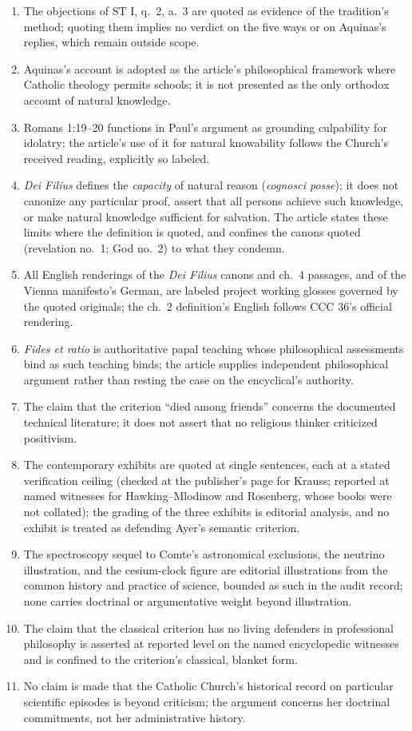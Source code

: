 \begin{enumerate}[leftmargin=1.45em,itemsep=0.25em]
\item The objections of ST I, q.~2, a.~3 are quoted as evidence of the tradition's method; quoting them implies no verdict on the five ways or on Aquinas's replies, which remain outside scope.
\item Aquinas's account is adopted as the article's philosophical framework where Catholic theology permits schools; it is not presented as the only orthodox account of natural knowledge.
\item Romans 1:19--20 functions in Paul's argument as grounding culpability for idolatry; the article's use of it for natural knowability follows the Church's received reading, explicitly so labeled.
\item \emph{Dei Filius} defines the \emph{capacity} of natural reason (\emph{cognosci posse}); it does not canonize any particular proof, assert that all persons achieve such knowledge, or make natural knowledge sufficient for salvation. The article states these limits where the definition is quoted, and confines the canons quoted (revelation no.~1; God no.~2) to what they condemn.
\item All English renderings of the \emph{Dei Filius} canons and ch.~4 passages, and of the Vienna manifesto's German, are labeled project working glosses governed by the quoted originals; the ch.~2 definition's English follows CCC 36's official rendering.
\item \emph{Fides et ratio} is authoritative papal teaching whose philosophical assessments bind as such teaching binds; the article supplies independent philosophical argument rather than resting the case on the encyclical's authority.
\item The claim that the criterion ``died among friends'' concerns the documented technical literature; it does not assert that no religious thinker criticized positivism.
\item The contemporary exhibits are quoted at single sentences, each at a stated verification ceiling (checked at the publisher's page for Krauss; reported at named witnesses for Hawking--Mlodinow and Rosenberg, whose books were not collated); the grading of the three exhibits is editorial analysis, and no exhibit is treated as defending Ayer's semantic criterion.
\item The spectroscopy sequel to Comte's astronomical exclusions, the neutrino illustration, and the cesium-clock figure are editorial illustrations from the common history and practice of science, bounded as such in the audit record; none carries doctrinal or argumentative weight beyond illustration.
\item The claim that the classical criterion has no living defenders in professional philosophy is asserted at reported level on the named encyclopedic witnesses and is confined to the criterion's classical, blanket form.
\item No claim is made that the Catholic Church's historical record on particular scientific episodes is beyond criticism; the argument concerns her doctrinal commitments, not her administrative history.
\end{enumerate}

